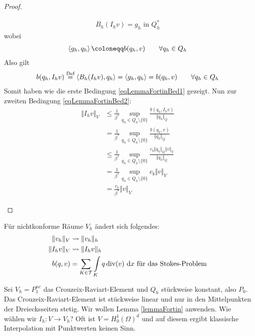 \begin{proof}
\begin{enumerate}[label=(\roman*)]
\begin{align*}
			B_h(I_h v)=g_h\text{ in }Q_h^\ast
		\end{align*}
		wobei
		\begin{align*}
			\dualpair{g_h}{q_h} \coloneqq b(q_h,v)\qquad\forall q_h\in Q_h
		\end{align*}
		Also gilt
		\begin{align*}
			b(q_h,I_h v)
			\overset{\text{Def}}=
			\left\langle B_h(I_h v), q_h \right\rangle
			=\left\langle g_h, q_h \right\rangle
			=b(q_h,v)\qquad\forall q_h\in Q_h
		\end{align*}
		Somit haben wie die erste Bedingung \eqref{eqLemmaFortinBed1} gezeigt.
		Nun zur zweiten Bedingung \eqref{eqLemmaFortinBed2}:
		\begin{align*}
			\Vert I_h v\Vert_V
			&\leq \frac{1}{\beta^\ast}\sup_{q_h\in Q_h\setminus\{0\}}\frac{b(q_h,I_h v)}{\Vert q_h\Vert_Q}\\
			&=\frac{1}{\beta^\ast}\sup_{q_h\in Q_h\setminus\{0\}}\frac{b(q_h,v)}{\Vert q_h\Vert_Q}\\
			&\leq\frac{1}{\beta^\ast}\sup_{q_h\in Q_h\setminus\{0\}}\frac{c_b\Vert q_h\Vert_{Q}\Vert v\Vert_V}{\Vert q_h\Vert_Q}\\
			&=\frac{1}{\beta^\ast}\sup_{q_h\in Q_h\setminus\{0\}}c_b\Vert v\Vert_V\\
			&=\frac{c_b}{\beta^\ast}\Vert v\Vert_V
		\end{align*}
	\end{enumerate}
\end{proof}

\begin{bemerkung}
	Für nichtkonforme Räume $V_h$ ändert sich folgendes:
	\begin{align*}
		\Vert v_h\Vert_V&\leadsto\Vert v_h\Vert_h\\
		\Vert I_h v\Vert_V&\leadsto\Vert I_h v\Vert_h\\
		b(q,v)&=\sum\limits_{K\in\mathcal{T}}\int\limits_K q\operatorname{div}(v)\text{ d} x \text{ für das Stokes-Problem}
	\end{align*}
\end{bemerkung}

Sei $V_h = P_1^{nc}$ das Crouzeix-Raviart-Element und $Q_h$ stückweise konstant, also $P_0$. %
Das Crouzeix-Raviart-Element ist stückweise linear und nur in den Mittelpunkten der Dreiecksseiten stetig.
Wir wollen Lemma \ref{lemmaFortin} anwenden. 
Wie wählen wir $I_h\colon V\to V_h$? Oft ist $V = H^1_0(\Omega)^d$ und auf diesem ergibt klassische Interpolation mit Punktwerten keinen Sinn. %

